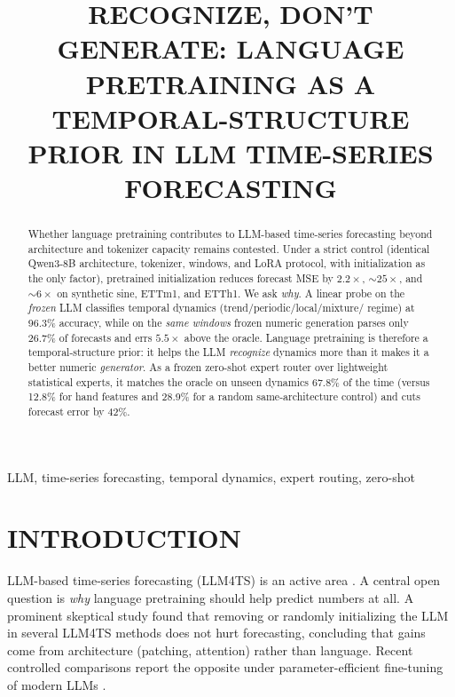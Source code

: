 \documentclass{article}
\title{RECOGNIZE, DON'T GENERATE: LANGUAGE PRETRAINING AS A TEMPORAL-STRUCTURE
PRIOR IN LLM TIME-SERIES FORECASTING}
\begin{document}
\maketitle

\begin{abstract}
Whether language pretraining contributes to LLM-based time-series forecasting
beyond architecture and tokenizer capacity remains contested.  Under a strict
control (identical Qwen3-8B architecture, tokenizer, windows, and LoRA
protocol, with initialization as the only factor), pretrained initialization
reduces forecast MSE by $2.2\times$, $\sim 25\times$, and $\sim 6\times$ on
synthetic sine, ETTm1, and ETTh1.  We ask \emph{why}.  A linear probe on the
\emph{frozen} LLM classifies temporal dynamics (trend/periodic/local/mixture/
regime) at 96.3\% accuracy, while on the \emph{same windows} frozen numeric
generation parses only 26.7\% of forecasts and errs $5.5\times$ above the
oracle.  Language pretraining is therefore a temporal-structure prior: it helps
the LLM \emph{recognize} dynamics more than it makes it a better numeric
\emph{generator}.  As a frozen zero-shot expert router over lightweight
statistical experts, it matches the oracle on unseen dynamics 67.8\% of the
time (versus 12.8\% for hand features and 28.9\% for a random same-architecture
control) and cuts forecast error by 42\%.
\end{abstract}

\begin{keywords}
LLM, time-series forecasting, temporal dynamics, expert routing, zero-shot
\end{keywords}

\section{INTRODUCTION}
\label{sec:intro}
LLM-based time-series forecasting (LLM4TS) is an active area
\cite{timellm,autotimes,prdts}.  A central open question is \emph{why} language
pretraining should help predict numbers at all.  A prominent skeptical study
\cite{tan2024useful} found that removing or randomly initializing the LLM in
several LLM4TS methods does not hurt forecasting, concluding that gains come
from architecture (patching, attention) rather than language.  Recent
controlled comparisons report the opposite under parameter-efficient
fine-tuning of modern LLMs \cite{randominit,crossmodalm}.
\end{document}
